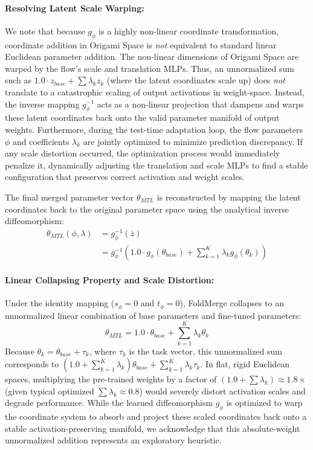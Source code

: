 \paragraph{Resolving Latent Scale Warping:}
We note that because $g_\phi$ is a highly non-linear coordinate transformation, coordinate addition in Origami Space is \emph{not} equivalent to standard linear Euclidean parameter addition. 
The non-linear dimensions of Origami Space are warped by the flow's scale and translation MLPs. 
Thus, an unnormalized sum such as $1.0 \cdot z_{base} + \sum \lambda_k z_k$ (where the latent coordinates scale up) does \emph{not} translate to a catastrophic scaling of output activations in weight-space. 
Instead, the inverse mapping $g_\phi^{-1}$ acts as a non-linear projection that dampens and warps these latent coordinates back onto the valid parameter manifold of output weights. 
Furthermore, during the test-time adaptation loop, the flow parameters $\phi$ and coefficients $\lambda_k$ are jointly optimized to minimize prediction discrepancy. 
If any scale distortion occurred, the optimization process would immediately penalize it, dynamically adjusting the translation and scale MLPs to find a stable configuration that preserves correct activation and weight scales.

The final merged parameter vector $\theta_{MTL}$ is reconstructed by mapping the latent coordinates back to the original parameter space using the analytical inverse diffeomorphism:
\begin{equation}
  \begin{aligned}
    \theta_{MTL}(\phi, \lambda) &= g_\phi^{-1}(\bar{z}) \\
    &= g_\phi^{-1}\left( 1.0 \cdot g_\phi(\theta_{base}) + \sum_{k=1}^K \lambda_k g_\phi(\theta_k) \right)
  \end{aligned}
\end{equation}

\paragraph{Linear Collapsing Property and Scale Distortion:} 
Under the identity mapping ($s_\phi = 0$ and $t_\phi = 0$), FoldMerge collapses to an unnormalized linear combination of base parameters and fine-tuned parameters:
\begin{equation}
  \theta_{MTL} = 1.0 \cdot \theta_{base} + \sum_{k=1}^K \lambda_k \theta_k
\end{equation}
Because $\theta_k = \theta_{base} + \tau_k$, where $\tau_k$ is the task vector, this unnormalized sum corresponds to $(1.0 + \sum_{k=1}^K \lambda_k) \theta_{base} + \sum_{k=1}^K \lambda_k \tau_k$. 
In flat, rigid Euclidean spaces, multiplying the pre-trained weights by a factor of $(1.0 + \sum \lambda_k) \approx 1.8\times$ (given typical optimized $\sum \lambda_k \approx 0.8$) would severely distort activation scales and degrade performance. 
While the learned diffeomorphism $g_\phi$ is optimized to warp the coordinate system to absorb and project these scaled coordinates back onto a stable activation-preserving manifold, we acknowledge that this absolute-weight unnormalized addition represents an exploratory heuristic. 

